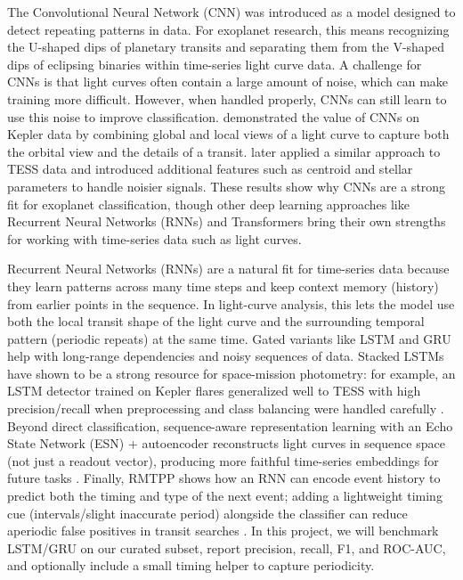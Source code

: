 \documentclass[letterpaper]{article} %
\begin{document}
The Convolutional Neural Network (CNN) was introduced as a model designed to detect repeating patterns in data. For exoplanet research, this means recognizing the U-shaped dips of planetary transits and separating them from the V-shaped dips of eclipsing binaries within time-series light curve data. A challenge for CNNs is that light curves often contain a large amount of noise, which can make training more difficult. However, when handled properly, CNNs can still learn to use this noise to improve classification. \cite{Dattilo2019identifyexoplanetsII} demonstrated the value of CNNs on Kepler data by combining global and local views of a light curve to capture both the orbital view and the details of a transit. \cite{Osborn2019rapidclassificationtesscandidates} later applied a similar approach to TESS data and introduced additional features such as centroid and stellar parameters to handle noisier signals. These results show why CNNs are a strong fit for exoplanet classification, though other deep learning approaches like Recurrent Neural Networks (RNNs) and Transformers bring their own strengths for working with time-series data such as light curves.

Recurrent Neural Networks (RNNs) are a natural fit for time-series data because they learn patterns across many time steps and keep context memory (history) from earlier points in the sequence. In light-curve analysis, this lets the model use both the local transit shape of the light curve and the surrounding temporal pattern (periodic repeats) at the same time. Gated variants like LSTM and GRU help with long-range dependencies and noisy sequences of data. Stacked LSTMs have shown to be a strong resource for space-mission photometry: for example, an LSTM detector trained on Kepler flares generalized well to TESS with high precision/recall when preprocessing and class balancing were handled carefully \cite{Vida2021findingflaresrecurrent}. Beyond direct classification, sequence-aware representation learning with an Echo State Network (ESN) + autoencoder reconstructs light curves in sequence space (not just a readout vector), producing more faithful time-series embeddings for future tasks \cite{kugler2016explorativeapproachkepler}. Finally, RMTPP shows how an RNN can encode event history to predict both the timing and type of the next event; adding a lightweight timing cue (intervals/slight inaccurate period) alongside the classifier can reduce aperiodic false positives in transit searches \cite{Du2016markedtemporalpoint}. In this project, we will benchmark LSTM/GRU on our curated subset, report precision, recall, F1, and ROC-AUC, and optionally include a small timing helper to capture periodicity.
\end{document}
